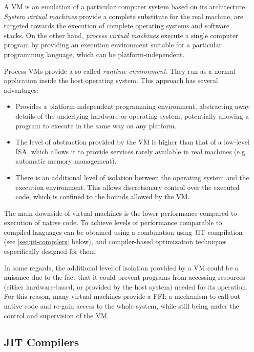 A \gls{VM} is an \gls{emulation} of a particular computer system based on its
architecture. \emph{System virtual machines} provide a complete substitute for
the real machine, are targeted towards the execution of complete operating
systems and software stacks. On the other hand, \emph{process virtual
machines} execute a single computer program by providing an execution
environment suitable for a particular programming language, which can be
platform-independent.

Process \gls{VM}s provide a so called \emph{runtime environment}. They run as
a normal application inside the host operating system. This approach has
several advantages:

\begin{itemize}
	\item Provides a platform-independent programming environment,
		abstracting away details of the underlying hardware or operating system,
		potentially allowing a program to execute in the same way on any platform.
	\item The level of abstraction provided by the \gls{VM} is higher than that
		of a low-level \gls{ISA}, which allows it to provide services rarely
		available in real machines (e.g. automatic memory management).
	\item There is an additional level of isolation between the operating system
		and the execution environment. This allows discretionary control over the
		executed code, which is confined to the bounds allowed by the \gls{VM}.
\end{itemize}

The main downside of virtual machines is the lower performance compared to
execution of native code. To achieve levels of performance comparable to
compiled languages can be obtained using a combination using \gls{JIT}
compilation (see \autoref{sec:jit-compilers} below), and compiler-based
optimization techniques especifically designed for them.

In some regards, the additional level of isolation provided by a \gls{VM}
could be a nuisance due to the fact that it could prevent programs from
accessing resources (either hardware-based, or provided by the host system)
needed for its operation. For this reason, many virtual machines provide
a \gls{FFI}: a mechanism to call-out native code and re-gain access to the
whole system, while still being under the control and supervision of the
\gls{VM}.


\subsection{JIT Compilers}
	\label{sec:jit-compilers}


